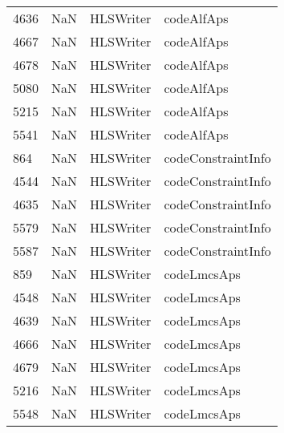 \begin{tabular}{llll}
4636 &                   NaN &                  HLSWriter &                                codeAlfAps \\
4667 &                   NaN &                  HLSWriter &                                codeAlfAps \\
4678 &                   NaN &                  HLSWriter &                                codeAlfAps \\
5080 &                   NaN &                  HLSWriter &                                codeAlfAps \\
5215 &                   NaN &                  HLSWriter &                                codeAlfAps \\
5541 &                   NaN &                  HLSWriter &                                codeAlfAps \\
864  &                   NaN &                  HLSWriter &                        codeConstraintInfo \\
4544 &                   NaN &                  HLSWriter &                        codeConstraintInfo \\
4635 &                   NaN &                  HLSWriter &                        codeConstraintInfo \\
5579 &                   NaN &                  HLSWriter &                        codeConstraintInfo \\
5587 &                   NaN &                  HLSWriter &                        codeConstraintInfo \\
859  &                   NaN &                  HLSWriter &                               codeLmcsAps \\
4548 &                   NaN &                  HLSWriter &                               codeLmcsAps \\
4639 &                   NaN &                  HLSWriter &                               codeLmcsAps \\
4666 &                   NaN &                  HLSWriter &                               codeLmcsAps \\
4679 &                   NaN &                  HLSWriter &                               codeLmcsAps \\
5216 &                   NaN &                  HLSWriter &                               codeLmcsAps \\
5548 &                   NaN &                  HLSWriter &                               codeLmcsAps \\

\end{tabular}
